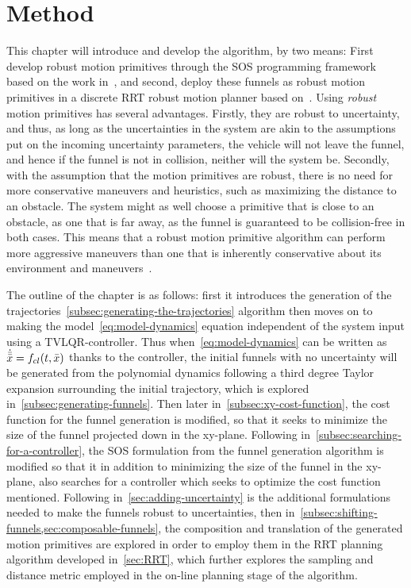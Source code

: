 \chapter{Method}

This chapter will introduce and develop the \rrtfunnel{} algorithm, by two
means: First develop robust motion primitives through the \ac{SOS} programming
framework based on the work in~\cite{majumdarFunnelLibrariesRealtime2017}, and
second, deploy these funnels as robust motion primitives in a discrete \ac{RRT}
robust motion planner based on~\cite{lavalleLav98cPdf}. Using \textit{robust}
motion primitives has several advantages. Firstly, they are robust to
uncertainty, and thus, as long as the uncertainties in the system are akin to
the assumptions put on the incoming uncertainty parameters, the vehicle will not
leave the funnel, and hence if the funnel is not in collision, neither will the
system be. Secondly, with the assumption that the motion primitives are robust,
there is no need for more conservative maneuvers and heuristics, such as
maximizing the distance to an obstacle. The system might as well choose a
primitive that is close to an obstacle, as one that is far away, as the funnel
is guaranteed to be collision-free in both cases. This means that a robust
motion primitive algorithm can perform more aggressive maneuvers than one that
is inherently conservative about its environment and
maneuvers~\cite{singhRobustOnlineMotion2017}.

The outline of the chapter is as follows: first it introduces the generation of
the trajectories~\cref{subsec:generating-the-trajectories} algorithm then moves
on to making the model~\cref{eq:model-dynamics} equation independent of the
system input using a \ac{TVLQR}-controller. Thus when~\cref{eq:model-dynamics}
can be written as \(\dot{\bar{\bar{x}}} = f_{cl}(t,\bar{x})\) thanks to the controller,
the initial funnels with no uncertainty will be generated from the polynomial
dynamics following a third degree Taylor expansion surrounding the initial
trajectory, which is explored in~\cref{subsec:generating-funnels}. Then later
in~\cref{subsec:xy-cost-function}, the cost function for the funnel generation
is modified, so that it seeks to minimize the size of the funnel projected down
in the xy-plane. Following in~\cref{subsec:searching-for-a-controller}, the
\ac{SOS} formulation from the funnel generation algorithm is modified so that it
in addition to minimizing the size of the funnel in the xy-plane, also searches
for a controller which seeks to optimize the cost function mentioned. Following
in~\cref{sec:adding-uncertainty} is the additional formulations needed to make
the funnels robust to uncertainties, then
in~\cref{subsec:shifting-funnels,sec:composable-funnels}, the composition and
translation of the generated motion primitives are explored in order to employ
them in the \ac{RRT} planning algorithm developed in~\cref{sec:RRT}, which
further explores the sampling and distance metric employed in the on-line
planning stage of the algorithm.

